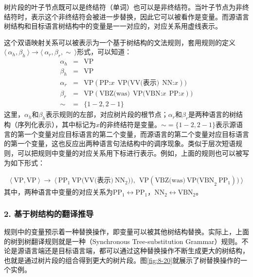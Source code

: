 \parinterval 树片段的叶子节点既可以是终结符（单词）也可以是非终结符。当叶子节点为非终结符时，表示这个非终结符会被进一步替换，因此它可以被看作是变量。而源语言树结构和目标语言树结构中的变量是一一对应的，对应关系用虚线表示。

\parinterval 这个双语映射关系可以被表示为一个基于树结构的文法规则，套用规则的定义$\langle\  \alpha_h, \beta_h\ \rangle \to \langle\ \alpha_r, \beta_r, \sim\ \rangle$形式，可以知道：
\begin{eqnarray}
\alpha_h &=& \textrm{VP} \nonumber \\
\beta_h &=& \textrm{VP} \nonumber \\
\alpha_r &=& \textrm{VP}(\textrm{PP:}x\ \ \textrm{VP(VV(表示)}\ \ \textrm{NN:}x)) \nonumber \\
\beta_r &=& \textrm{VP}(\textrm{VBZ(was)}\ \ \textrm{VP(VBN:}x\ \ \textrm{PP:}x)) \nonumber \\
\sim &=& \{1-2,2-1\} \nonumber
\end{eqnarray}
\noindent 这里，$\alpha_h$和$\beta_h$表示规则的左部，对应树片段的根节点；$\alpha_r$和$\beta_r$是两种语言的树结构（序列化表示），其中标记为$x$的非终结符是变量。$\sim = \{1-2,2-1\}$表示源语言的第一个变量对应目标语言的第二个变量，而源语言的第二个变量对应目标语言的第一个变量，这也反应出两种语言句法结构中的调序现象。类似于层次短语规则，可以把规则中变量的对应关系用下标进行表示。例如，上面的规则也可以被写为如下形式：

\begin{eqnarray}
\langle\ \textrm{VP}, \textrm{VP}\ \rangle\ \to\ \langle\ \textrm{PP}_{1} \ \textrm{VP(VV(表示)}\ \textrm{NN}_{2})),\ \ \textrm{VP}(\textrm{VBZ(was)}\ \textrm{VP(VBN}_{2} \ \textrm{PP}_{1})) \ \rangle \nonumber
\end{eqnarray}
\noindent 其中，两种语言中变量的对应关系为$\textrm{PP}_1 \leftrightarrow \textrm{PP}_1$，$\textrm{NN}_2 \leftrightarrow \textrm{VBN}_2$。


\subsubsection{2. 基于树结构的翻译推导}

\parinterval 规则中的变量预示着一种替换操作，即变量可以被其他树结构替换。实际上，上面的树到树翻译规则就是一种{\small{}}（Synchronous Tree-substitution Grammar）规则。不论是源语言端还是目标语言端，都可以通过这种替换操作不断生成更大的树结构，也就是通过树片段的组合得到更大的树片段。图\ref{fig:8-20}就展示了树替换操作的一个实例。

